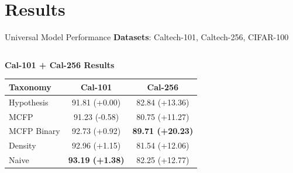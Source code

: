 \documentclass[aspectratio=169]{beamer}
\begin{document}
\section{Results}

\begin{frame}{Universal Model Performance}
    \textbf{Datasets}: Caltech-101, Caltech-256, CIFAR-100

    \begin{columns}[T]
        \begin{column}{0.48\textwidth}
            \textbf{Cal-101 + Cal-256 Results}
            \begin{table}[h]
                \centering
                \tiny
                \begin{tabular}{lcc}
                    \toprule
                    \textbf{Taxonomy} & \textbf{Cal-101}       & \textbf{Cal-256}        \\
                    \midrule
                    Hypothesis        & 91.81 (+0.00)          & 82.84 (+13.36)          \\
                    MCFP              & 91.23 (-0.58)          & 80.75 (+11.27)          \\
                    MCFP Binary       & 92.73 (+0.92)          & \textbf{89.71 (+20.23)} \\
                    Density           & 92.96 (+1.15)          & 81.54 (+12.06)          \\
                    Naive             & \textbf{93.19 (+1.38)} & 82.25 (+12.77)          \\
                    \bottomrule
                \end{tabular}
            \end{table}
        \end{column}


\end{columns}
\end{frame}
\end{document}
